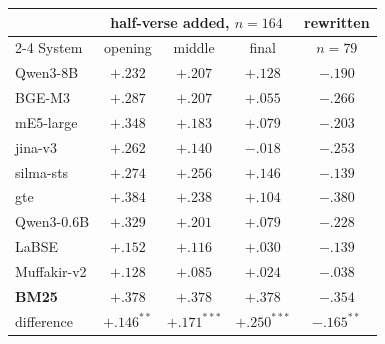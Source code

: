 \begin{tabular}{l ccc c}
\toprule
& \multicolumn{3}{c}{half-verse added, $n{=}164$} & rewritten \\
\cmidrule(lr){2-4}
System & opening & middle & final & $n{=}79$ \\
\midrule
Qwen3-8B & ${+}.232$ & ${+}.207$ & ${+}.128$ & ${-}.190$ \\
BGE-M3 & ${+}.287$ & ${+}.207$ & ${+}.055$ & ${-}.266$ \\
mE5-large & ${+}.348$ & ${+}.183$ & ${+}.079$ & ${-}.203$ \\
jina-v3 & ${+}.262$ & ${+}.140$ & ${-}.018$ & ${-}.253$ \\
silma-sts & ${+}.274$ & ${+}.256$ & ${+}.146$ & ${-}.139$ \\
gte & ${+}.384$ & ${+}.238$ & ${+}.104$ & ${-}.380$ \\
Qwen3-0.6B & ${+}.329$ & ${+}.201$ & ${+}.079$ & ${-}.228$ \\
LaBSE & ${+}.152$ & ${+}.116$ & ${+}.030$ & ${-}.139$ \\
Muffakir-v2 & ${+}.128$ & ${+}.085$ & ${+}.024$ & ${-}.038$ \\
\midrule
\textbf{BM25} & ${+}.378$ & ${+}.378$ & ${+}.378$ & ${-}.354$ \\
\midrule
difference & ${+}.146^{**}$ & ${+}.171^{***}$ & ${+}.250^{***}$ & ${-}.165^{**}$ \\
\bottomrule
\end{tabular}
